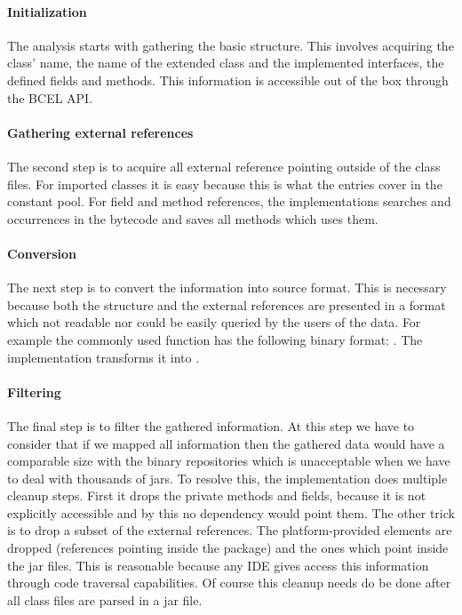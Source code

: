 \paragraph{Initialization}
The analysis starts with gathering the basic structure. This involves acquiring
the class' name, the name of the extended class and the implemented interfaces,
the defined fields and methods. This information is accessible out of the box
through the BCEL API.  

\paragraph{Gathering external references}
The second step is to acquire all external reference pointing outside of the
class files. For imported classes it is easy because this is what the
 entries cover in the constant pool. For field and method
references, the implementations searches  and
 occurrences in the bytecode and saves all methods 
which uses them.

\paragraph{Conversion}
The next step is to convert the information into source format. This is
necessary because both the structure and the external references are presented
in a format which not readable nor could be easily queried by the users of the
data. For example the commonly used  function has the
following binary format: . The implementation
transforms it into .

\paragraph{Filtering}
The final step is to filter  the gathered information. At this step we have to
consider that if we mapped all information then the gathered data would have a
comparable size with the binary repositories which is unacceptable when we have
to deal with thousands of jars. To resolve this, the implementation does
multiple cleanup steps. First it drops the private methods and fields, because
it is not explicitly accessible and by this no dependency would point them. The
other trick is to drop a subset of the external references. The
platform-provided elements are dropped (references pointing inside the
 package) and the ones which point inside the jar files. This is
reasonable because any IDE gives access this information through code traversal
capabilities. Of course this cleanup needs do be done after all class files are 
parsed in a jar file. 


